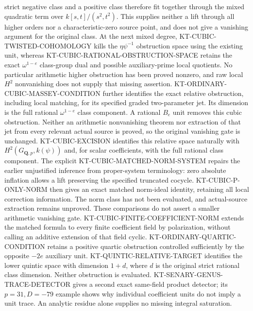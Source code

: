 strict negative class and a positive class therefore fit
together through the mixed quadratic term over
$k[s,t]/(s^2,t^2)$. This supplies neither a lift through all
higher orders nor a characteristic-zero source point, and
does not give a vanishing argument for the original class.
At the next mixed degree, KT-CUBIC-TWISTED-COHOMOLOGY kills
the $\eta\psi^{-1}$ obstruction space using the existing unit,
whereas KT-CUBIC-RATIONAL-OBSTRUCTION-SPACE retains the exact
$\omega^{1-e}$ class-group dual and possible auxiliary-prime
local quotients. No particular arithmetic higher obstruction
has been proved nonzero, and raw local $H^2$ nonvanishing
does not supply that missing assertion.
KT-ORDINARY-CUBIC-MASSEY-CONDITION further identifies the exact
relative obstruction, including local matching, for its specified
graded two-parameter jet. Its dimension is the full rational
$\omega^{1-e}$ class component. A rational $B_e$ unit removes
this cubic obstruction. Neither an arithmetic nonvanishing theorem
nor extraction of that jet from every relevant actual source is
proved, so the original vanishing gate is unchanged.
KT-CUBIC-EXCISION identifies this relative space naturally with
$H^2(G_{\mathbf Q,p},k(\psi))$ and, for scalar coefficients,
with the full rational class component. The explicit
KT-CUBIC-MATCHED-NORM-SYSTEM repairs the earlier unjustified
inference from proper-system terminology: zero absolute inflation
allows a lift preserving the specified truncated cocycle.
KT-CUBIC-P-ONLY-NORM then gives an exact matched norm-ideal
identity, retaining all local correction information. The norm
class has not been evaluated, and actual-source extraction remains
unproved. These comparisons do not assert a smaller arithmetic
vanishing gate.
KT-CUBIC-FINITE-COEFFICIENT-NORM extends the matched formula
to every finite coefficient field by polarization, without
calling an additive extension of that field cyclic.
KT-ORDINARY-QUARTIC-CONDITION retains a positive quartic
obstruction controlled sufficiently by the opposite $-2e$
auxiliary unit. KT-QUINTIC-RELATIVE-TARGET identifies the lower
quintic space with dimension $1+d$, where $d$ is the original
strict rational class dimension. Neither obstruction is evaluated.
KT-SENARY-GENUS-TRACE-DETECTOR gives a second exact same-field
product detector; its $p=31,D=-79$ example shows why individual
coefficient units do not imply a unit trace. An analytic residue
alone supplies no missing integral saturation.

